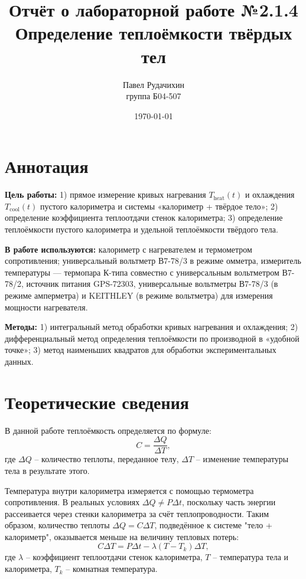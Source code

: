 \documentclass[a4paper,12pt]{article}
\begin{document}
\title{Отчёт о лабораторной работе №2.1.4 \\ Определение теплоёмкости твёрдых тел}
\author{Павел Рудачихин \\ группа Б04-507}
\date{\today}

	\maketitle
	
	\section*{Аннотация}
	
	\hspace{4mm}\textbf{Цель работы:} 1) прямое измерение кривых нагревания $T_{\text{heat}}(t)$ и охлаждения $T_{\text{cool}}(t)$ пустого калориметра и системы «калориметр + твёрдое тело»; 2) определение коэффициента теплоотдачи стенок калориметра; 3) определение теплоёмкости пустого калориметра и удельной теплоёмкости твёрдого тела.
	
	\textbf{В работе используются:} калориметр с нагревателем и термометром сопротивления; универсальный вольтметр В7-78/3 в режиме омметра, измеритель температуры — термопара К-типа совместно с универсальным вольтметром В7-78/2, источник питания GPS-72303, универсальные вольтметры В7-78/3 (в режиме амперметра) и KEITHLEY (в режиме вольтметра) для измерения мощности нагревателя.
	
	\textbf{Методы:} 1) интегральный метод обработки кривых нагревания и охлаждения; 2) дифференциальный метод определения теплоёмкости по производной в «удобной точке»; 3) метод наименьших квадратов для обработки экспериментальных данных.

\section{Теоретические сведения}
В данной работе теплоёмкость определяется по формуле:
\begin{equation}
    C = \frac{\Delta Q}{\Delta T},
    \label{eq:def}
\end{equation}
где $\Delta Q$ – количество теплоты, переданное телу, $\Delta T$ – изменение температуры тела в результате этого.

Температура внутри калориметра измеряется с помощью термометра сопротивления. В реальных условиях $\Delta Q \neq P\Delta t$, поскольку часть энергии рассеивается через стенки калориметра за счёт теплопроводности. Таким образом, количество теплоты $\Delta Q = C\Delta T$, подведённое к системе "тело + калориметр", оказывается меньше на величину тепловых потерь:
\begin{equation}
    C\Delta T = P\Delta t - \lambda(T - T_k)\Delta T,
    \label{eq:base}
\end{equation}
где $\lambda$ – коэффициент теплоотдачи стенок калориметра, $T$ – температура тела и калориметра, $T_k$ – комнатная температура.
\end{document}
